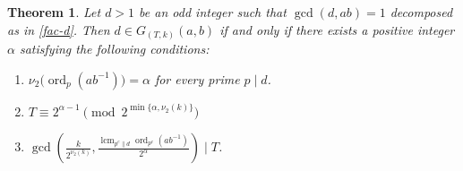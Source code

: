 \documentclass[pdflatex,sn-mathphys-num]{sn-jnl}%
\theoremstyle{thmstyleone}%
\newtheorem{theorem}{Theorem}%
\theoremstyle{thmstyletwo}%
\theoremstyle{thmstylethree}%
\newcommand{\ord}{\operatorname{ord}}
\newcommand{\lcm}{\operatorname{lcm}}
\begin{document}
\begin{theorem}\label{thm:2adic}
Let $d>1$ be an odd integer such that $\gcd(d,ab)=1$ decomposed as in \eqref{fac-d}. Then
$
d\in G_{(T,k)}(a,b)
$
if and only if there exists a positive integer $\alpha$ satisfying the following conditions:
\begin{enumerate}[$(1)$]
\item
$
\nu_2\bigl(\ord_p(ab^{-1})\bigr)=\alpha$
for every prime $ p\mid d$. 

\item $
T\equiv 2^{\alpha-1}\pmod{2^{\min\{\alpha,\nu_2(k)\}}}$

\item
$
\gcd\left(\frac{k}{2^{\nu_2(k)}},
\frac{\lcm_{p^e\parallel d}\ord_{p^e}(ab^{-1})}{2^\alpha}\right)\mid T$.
\end{enumerate}
\end{theorem}
\end{document}
